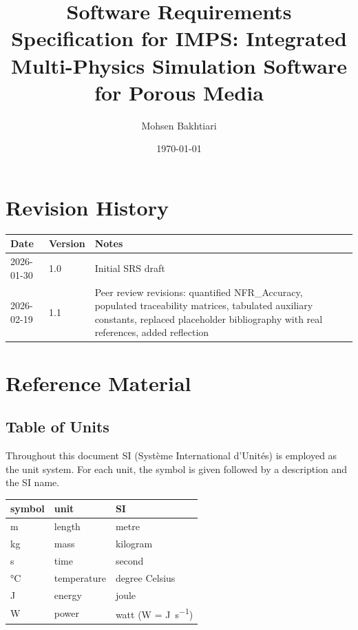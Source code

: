 \documentclass[12pt]{article}
\newcommand{\progname}{IMPS}
\begin{document}
\title{Software Requirements Specification for \progname: Integrated Multi-Physics Simulation Software for Porous Media}
\author{Mohsen Bakhtiari}
\date{\today}
\maketitle

\newpage
{}
\tableofcontents
\newpage

\section*{Revision History}

\begin{tabularx}{\textwidth}{p{3cm}p{2cm}X}
\toprule {\bf Date} & {\bf Version} & {\bf Notes}\\
\midrule
2026-01-30 & 1.0 & Initial SRS draft\\
2026-02-19 & 1.1 & Peer review revisions: quantified NFR\_Accuracy, populated traceability matrices, tabulated auxiliary constants, replaced placeholder bibliography with real references, added reflection\\
\bottomrule
\end{tabularx}

\newpage
\section{Reference Material}

\subsection{Table of Units}

Throughout this document SI (Syst\`{e}me International d'Unit\'{e}s) is employed
as the unit system. For each unit, the symbol is given followed by a description
and the SI name.

\renewcommand{\arraystretch}{1.2}
\noindent \begin{tabular}{l l l}
  \toprule
  \textbf{symbol} & \textbf{unit} & \textbf{SI}\\
  \midrule
  \si{\metre} & length & metre\\
  \si{\kilogram} & mass & kilogram\\
  \si{\second} & time & second\\
  \si{\celsius} & temperature & degree Celsius\\
  \si{\joule} & energy & joule\\
  \si{\watt} & power & watt (W = \si{\joule\per\second})\\
  \bottomrule
\end{tabular}
\end{document}
